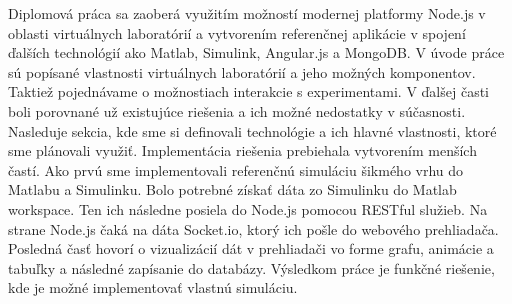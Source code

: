 Diplomová práca sa zaoberá využitím možností modernej platformy Node.js v oblasti virtuálnych laboratórií a vytvorením referenčnej aplikácie v spojení ďalších technológií ako Matlab, Simulink, Angular.js a MongoDB. V úvode práce sú popísané vlastnosti virtuálnych laboratórií a jeho možných komponentov. Taktiež pojednávame o možnostiach interakcie s experimentami. V ďalšej časti boli porovnané už existujúce riešenia a ich možné nedostatky v súčasnosti. Nasleduje sekcia, kde sme si definovali technológie a ich hlavné vlastnosti, ktoré sme plánovali využiť. Implementácia riešenia prebiehala vytvorením menších častí. Ako prvú sme implementovali referenčnú simuláciu šikmého vrhu do Matlabu a Simulinku. Bolo potrebné získať dáta zo Simulinku do Matlab workspace. Ten ich následne posiela do Node.js pomocou RESTful služieb. Na strane Node.js čaká na dáta Socket.io, ktorý ich pošle do webového prehliadača. Posledná časť hovorí o vizualizácií dát v prehliadači vo forme grafu, animácie a tabuľky a následné zapísanie do databázy. Výsledkom práce je funkčné riešenie, kde je možné implementovať vlastnú simuláciu.